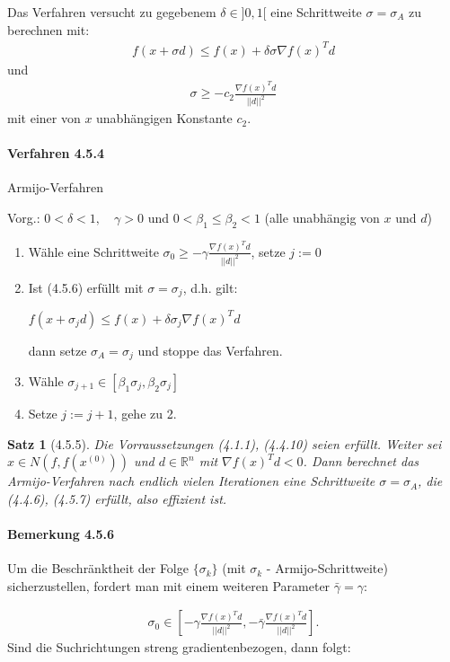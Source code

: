 \documentclass[ngerman,halfparskip]{scrartcl}
\newtheorem*{satz}{Satz}
\theoremstyle{definition}
\def\R{\mathbb R}
\begin{document}
Das Verfahren versucht zu gegebenem $\delta \in ]0,1[$ eine Schrittweite $\sigma=\sigma_A$ zu berechnen mit:
\begin{gather*}\tag{4.5.6}
f(x+\sigma d)\leq f(x)+\delta \sigma \nabla f(x)^Td
\end{gather*}
und 
\begin{gather*}\tag{4.5.7}
\sigma \geq -c_2\frac{\nabla f(x)^Td}{||d||^2}
\end{gather*}
mit einer von $x$ unabhängigen Konstante $c_2$.

\paragraph{Verfahren 4.5.4} Armijo-Verfahren

Vorg.: $0<\delta <1, \quad \gamma>0$ und $0<\beta_1\leq \beta _2<1$ (alle unabhängig von $x$ und $d$)
\begin{enumerate}
\item Wähle eine Schrittweite $\sigma_0\geq -\gamma \frac{\nabla f(x)^Td}{||d||^2}$, setze $j:=0$
\item Ist (4.5.6) erfüllt mit $\sigma=\sigma_j$, d.h. gilt:

$f(x+\sigma_j d)\leq f(x)+\delta\sigma_j \nabla f(x)^Td$

dann setze $\sigma_A=\sigma_j$ und stoppe das Verfahren.
\item Wähle $\sigma_{j+1}\in [\beta_1\sigma_j,\beta_2\sigma_j]$
\item Setze $j:=j+1$, gehe zu 2.
\end{enumerate}

\begin{satz}[4.5.5]
Die Vorraussetzungen (4.1.1), (4.4.10) seien erfüllt. Weiter sei $x\in N(f,f(x^{(0)}))$ und $d\in\R^n$ mit $\nabla f(x)^Td<0$. Dann berechnet das Armijo-Verfahren nach endlich vielen Iterationen eine Schrittweite $\sigma=\sigma_A$, die (4.4.6), (4.5.7) erfüllt, also effizient ist.
\end{satz}

\paragraph{Bemerkung 4.5.6} Um die Beschränktheit der Folge $\{\sigma_k\}$ (mit $\sigma_k$ - Armijo-Schrittweite) sicherzustellen, fordert man mit einem weiteren Parameter $\bar\gamma=\gamma$:

\begin{gather*}\tag{4.5.8}
\sigma_0\in\left [ -\gamma \frac {\nabla f(x)^Td}{||d||^2},-\bar \gamma \frac {\nabla f(x)^Td}{||d||^2}\right ].
\end{gather*}
Sind die Suchrichtungen streng gradientenbezogen, dann folgt:
\end{document}
